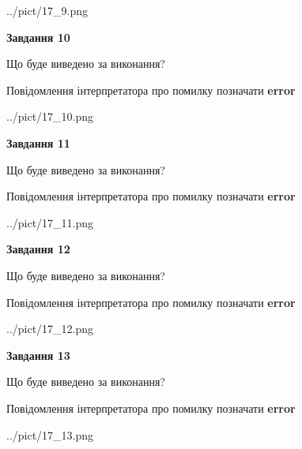 \documentclass[11pt, ukrainian]{article}
\begin{document}
{\begin {large}
\begin{center}
	{../pict/17_9.png}
\end{center}
\newpage

{\begin {center}\textbf{Завдання 10}\end {center}}\par
Що буде виведено за виконання? \par
Повідомлення інтерпретатора про помилку позначати \textbf{error}

\begin{center}
	{../pict/17_10.png}
\end{center}
\newpage

{\begin {center}\textbf{Завдання 11}\end {center}}\par
Що буде виведено за виконання? \par
Повідомлення інтерпретатора про помилку позначати \textbf{error}

\begin{center}
	{../pict/17_11.png}
\end{center}
\newpage

{\begin {center}\textbf{Завдання 12}\end {center}}\par
Що буде виведено за виконання? \par
Повідомлення інтерпретатора про помилку позначати \textbf{error}

\begin{center}
	{../pict/17_12.png}
\end{center}
\newpage

{\begin {center}\textbf{Завдання 13}\end {center}}\par
Що буде виведено за виконання? \par
Повідомлення інтерпретатора про помилку позначати \textbf{error}

\begin{center}
	{../pict/17_13.png}
\end{center}
\newpage


\end{large}}
\end{document}

